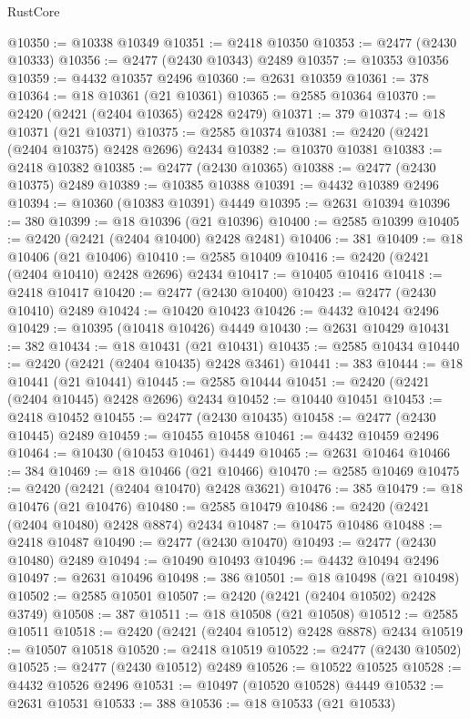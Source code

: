 \begin{lexlean}{RustCore}
\begin{coremodule}
@10350 := @10338 @10349
@10351 := @2418 @10350
@10353 := @2477 (@2430 @10333)
@10356 := @2477 (@2430 @10343) @2489
@10357 := @10353 @10356
@10359 := @4432 @10357 @2496
@10360 := @2631 @10359
@10361 := 378
@10364 := @18 @10361 (@21 @10361)
@10365 := @2585 @10364
@10370 := @2420 (@2421 (@2404 @10365) @2428 @2479)
@10371 := 379
@10374 := @18 @10371 (@21 @10371)
@10375 := @2585 @10374
@10381 := @2420 (@2421 (@2404 @10375) @2428 @2696) @2434
@10382 := @10370 @10381
@10383 := @2418 @10382
@10385 := @2477 (@2430 @10365)
@10388 := @2477 (@2430 @10375) @2489
@10389 := @10385 @10388
@10391 := @4432 @10389 @2496
@10394 := @10360 (@10383 @10391) @4449
@10395 := @2631 @10394
@10396 := 380
@10399 := @18 @10396 (@21 @10396)
@10400 := @2585 @10399
@10405 := @2420 (@2421 (@2404 @10400) @2428 @2481)
@10406 := 381
@10409 := @18 @10406 (@21 @10406)
@10410 := @2585 @10409
@10416 := @2420 (@2421 (@2404 @10410) @2428 @2696) @2434
@10417 := @10405 @10416
@10418 := @2418 @10417
@10420 := @2477 (@2430 @10400)
@10423 := @2477 (@2430 @10410) @2489
@10424 := @10420 @10423
@10426 := @4432 @10424 @2496
@10429 := @10395 (@10418 @10426) @4449
@10430 := @2631 @10429
@10431 := 382
@10434 := @18 @10431 (@21 @10431)
@10435 := @2585 @10434
@10440 := @2420 (@2421 (@2404 @10435) @2428 @3461)
@10441 := 383
@10444 := @18 @10441 (@21 @10441)
@10445 := @2585 @10444
@10451 := @2420 (@2421 (@2404 @10445) @2428 @2696) @2434
@10452 := @10440 @10451
@10453 := @2418 @10452
@10455 := @2477 (@2430 @10435)
@10458 := @2477 (@2430 @10445) @2489
@10459 := @10455 @10458
@10461 := @4432 @10459 @2496
@10464 := @10430 (@10453 @10461) @4449
@10465 := @2631 @10464
@10466 := 384
@10469 := @18 @10466 (@21 @10466)
@10470 := @2585 @10469
@10475 := @2420 (@2421 (@2404 @10470) @2428 @3621)
@10476 := 385
@10479 := @18 @10476 (@21 @10476)
@10480 := @2585 @10479
@10486 := @2420 (@2421 (@2404 @10480) @2428 @8874) @2434
@10487 := @10475 @10486
@10488 := @2418 @10487
@10490 := @2477 (@2430 @10470)
@10493 := @2477 (@2430 @10480) @2489
@10494 := @10490 @10493
@10496 := @4432 @10494 @2496
@10497 := @2631 @10496
@10498 := 386
@10501 := @18 @10498 (@21 @10498)
@10502 := @2585 @10501
@10507 := @2420 (@2421 (@2404 @10502) @2428 @3749)
@10508 := 387
@10511 := @18 @10508 (@21 @10508)
@10512 := @2585 @10511
@10518 := @2420 (@2421 (@2404 @10512) @2428 @8878) @2434
@10519 := @10507 @10518
@10520 := @2418 @10519
@10522 := @2477 (@2430 @10502)
@10525 := @2477 (@2430 @10512) @2489
@10526 := @10522 @10525
@10528 := @4432 @10526 @2496
@10531 := @10497 (@10520 @10528) @4449
@10532 := @2631 @10531
@10533 := 388
@10536 := @18 @10533 (@21 @10533)

\end{coremodule}
\end{lexlean}
